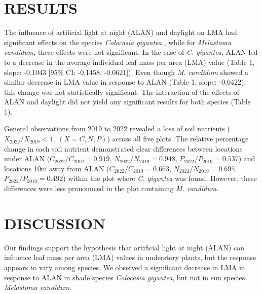 \documentclass[
  12pt,
  letterpaper,
  DIV=11,
  numbers=noendperiod]{scrartcl}
\begin{document}
\hypertarget{results}{%
\section{RESULTS}\label{results}}

The influence of artificial light at night (ALAN) and daylight on LMA
had significant effects on the species \emph{Colocasia gigantea }, while
for \emph{Melastoma candidum}, these effects were not significant. In
the case of \emph{C. gigantea}, ALAN led to a decrease in the average
individual leaf mass per area (LMA) value (Table 1, slope: -0.1043
{[}95\% CI: -0.1458, -0.0621{]}). Even though \emph{M. candidum} showed
a similar decrease in LMA value in response to ALAN (Table 1, slope:
-0.0422), this change was not statistically significant. The interaction
of the effects of ALAN and daylight did not yield any significant
results for both species (Table 1).

General observations from 2019 to 2022 revealed a loss of soil nutrients
(\(X_{2022}/X_{2019} < 1,\ (X = C,N,P)\)) across all five plots. The
relative percentage change in each soil nutrient demonstrated clear
differences between locations under ALAN (\(C_{2022}/C_{2019} = 0.919\),
\(N_{2022}/N_{2019} = 0.948\), \(P_{2022}/P_{2019} = 0.537\)) and
locations 10m away from ALAN (\(C_{2022}/C_{2019} = 0.663\),
\(N_{2022}/N_{2019} = 0.695\), \(P_{2022}/P_{2019} = 0.492\)) within the
plot where \emph{C. gigantea} was found. However, these differences were
less pronounced in the plot containing \emph{M. candidum}.

\hypertarget{discussion}{%
\section{DISCUSSION}\label{discussion}}

Our findings support the hypothesis that artificial light at night
(ALAN) can influence leaf mass per area (LMA) values in understory
plants, but the response appears to vary among species. We observed a
significant decrease in LMA in response to ALAN in shade species
\emph{Colocasia gigantea}, but not in sun species \emph{Melastoma
candidum}.
\end{document}
